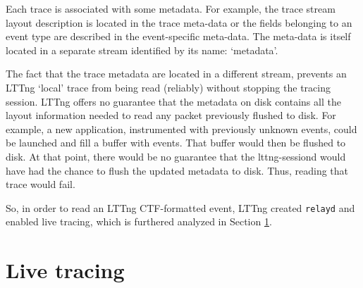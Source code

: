 Each trace is associated with some metadata. For example, the trace stream
layout description is located in the trace meta-data or the fields belonging to
an event type are described in the event-specific meta-data. The meta-data is
itself located in a separate stream identified by its name: `metadata'.


The fact that the trace metadata are located in a different stream, prevents an
LTTng `local' trace from being read (reliably) without stopping the tracing
session. LTTng offers no guarantee that the metadata on disk contains all the
layout information needed to read any packet previously flushed to disk. For
example, a new application, instrumented with previously unknown events, could
be launched and fill a buffer with events. That buffer would then be flushed to
disk. At that point, there would be no guarantee that the lttng-sessiond would
have had the chance to flush the updated metadata to disk. Thus, reading that
trace would fail.

So, in order to read an LTTng CTF-formatted event, LTTng created \texttt{relayd}
and enabled live tracing, which is furthered analyzed in Section
\ref{sec:relayd}.

\section{Live tracing}\label{sec:relayd}

